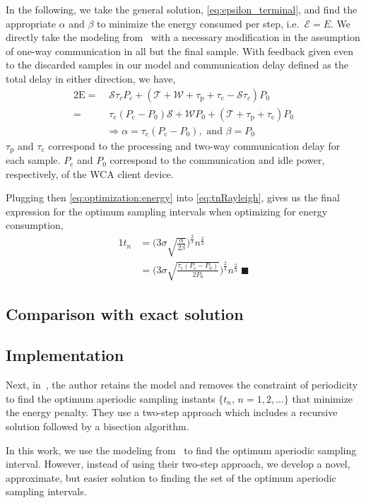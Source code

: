 In the following, we take the general solution, \cref{eq:epsilon_terminal}, and find the appropriate \( \alpha \) and \( \beta \) to minimize the energy consumed per step, i.e.\ \( \mathcal{E}=E \).
We directly take the modeling from~\cite{moothedath2022energy2} with a necessary modification in the assumption of one-way communication in all but the final sample.
With feedback given even to the discarded samples in our model and communication delay defined as the total delay in either direction, we have, 
\begin{alignat}{2}
    \mathrm{E}=&\;\mathcal{S}\tau_cP_c+(\mathcal{T}+\mathcal{W}+\tau_\mathrm{p}+\tau_\mathrm{c}-\mathcal{S}\tau_c)P_0\nonumber\\
    =&\;\tau_{\text{c}}(P_{\text{c}} -P_0)\mathcal{S}+\mathcal{W}P_0+(\mathcal{T}+\tau_{\text{p}} +\tau_{\text{c}}) P_0\nonumber\\
&\Rightarrow \alpha=\tau_{\text{c}}(P_{\text{c}} -P_0),\text{ and }\beta=P_0 \label{eq:optimization:energy}
\end{alignat}
\( \tau_\text{p} \) and \( \tau_\text{c} \) correspond to the processing and two-way communication delay for each sample.
\( P_\text{c} \) and \( P_0 \) correspond to the communication and idle power, respectively, of the \gls{WCA} client device.

Plugging then \cref{eq:optimization:energy} into \cref{eq:tnRayleigh}, gives us the final expression for the optimum sampling intervals when optimizing for energy consumption,
\begin{alignat}{1}
    t_n&=\Big(3\sigma\!\sqrt{\tfrac{\alpha}{2\beta}}\Big)^{\frac{2}{3}}n^{\frac{2}{3}}\nonumber\\
    &=\Big(3\sigma\!\sqrt{\tfrac{\tau_{\text{c}}(P_{\text{c}} -P_0)}{2 P_0}}\Big)^{\frac{2}{3}}n^{\frac{2}{3}}\;\blacksquare\label{eq:tnRayleigh:energy}
\end{alignat}

\subsection{Comparison with exact solution}


\subsection{Implementation}

Next, in~\cite{moothedath2022energy2}, the author retains the model and removes the constraint of periodicity to find the optimum aperiodic sampling instants $\{t_n,\,n=1,2,\dots\}$ that minimize the energy penalty.
They use a two-step approach which includes a recursive solution followed by a bisection algorithm.

In this work, we use the modeling from~\cite{moothedath2022energy2} to find the optimum aperiodic sampling interval.
However, instead of using their two-step approach, we develop a novel, approximate, but easier solution to finding the set of the optimum aperiodic sampling intervals.

